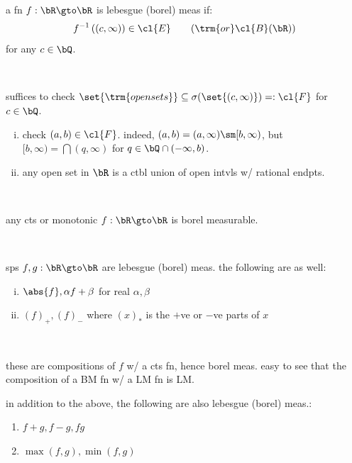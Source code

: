 \begin{lm}
	a fn $f:\bR\gto\bR$ is lebesgue (borel) meas if:
	\begin{equation*}
		f^{-1}\left((c,\infty)\right)\in\cl{E} \qquad (\trm{or } \cl{B}(\bR))
	\end{equation*}
	for any $c\in\bQ$.
\end{lm} \

\begin{pf}
	suffices to check $\set{\trm{open sets}}\subseteq\sigma(\set{(c,\infty)})=:\cl{F}$
	for $c\in\bQ$.
	\begin{enumerate}[i)]
		\item check $(a,b)\in\cl{F}$.
			indeed, $(a,b)=(a,\infty)\sm[b,\infty)$, but
			$[b,\infty)=\bigcap(q,\infty)$ for $q\in\bQ\cap(-\infty,b)$.
		\item any open set in $\bR$ is a ctbl union of open intvls w/
			rational endpts.
	\end{enumerate}
\end{pf} \

\begin{crll}
	any cts or monotonic $f:\bR\gto\bR$ is borel measurable.
\end{crll} \

\begin{prop}
	sps $f,g:\bR\gto\bR$ are lebesgue (borel) meas.
	the following are as well:
	\begin{enumerate}[i)]
		\item $\abs{f},\alpha f+\beta$ for real $\alpha,\beta$
		\item $(f)_{+},(f)_{-}$ where $(x)_{*}$ is the $+$ve or $-$ve parts of $x$
	\end{enumerate}
\end{prop} \

\begin{pf}
	these are compositions of $f$ w/ a cts fn, hence borel meas.
	easy to see that the composition of a BM fn w/ a LM fn is LM.
\end{pf}


\begin{prop}
	in addition to the above, the following are also lebesgue (borel) meas.:
	\begin{enumerate}
		\item[iii)] $f+g,f-g,fg$
		\item[iv)] $\max(f,g),\min(f,g)$
	\end{enumerate}
\end{prop} \

